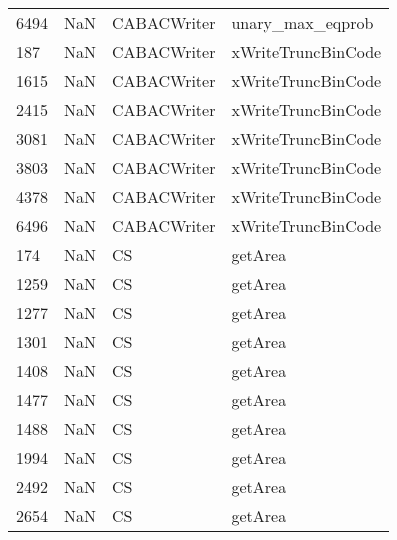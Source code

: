 \begin{tabular}{llll}
6494 &                   NaN &                CABACWriter &                          unary\_max\_eqprob \\
187  &                   NaN &                CABACWriter &                        xWriteTruncBinCode \\
1615 &                   NaN &                CABACWriter &                        xWriteTruncBinCode \\
2415 &                   NaN &                CABACWriter &                        xWriteTruncBinCode \\
3081 &                   NaN &                CABACWriter &                        xWriteTruncBinCode \\
3803 &                   NaN &                CABACWriter &                        xWriteTruncBinCode \\
4378 &                   NaN &                CABACWriter &                        xWriteTruncBinCode \\
6496 &                   NaN &                CABACWriter &                        xWriteTruncBinCode \\
174  &                   NaN &                         CS &                                   getArea \\
1259 &                   NaN &                         CS &                                   getArea \\
1277 &                   NaN &                         CS &                                   getArea \\
1301 &                   NaN &                         CS &                                   getArea \\
1408 &                   NaN &                         CS &                                   getArea \\
1477 &                   NaN &                         CS &                                   getArea \\
1488 &                   NaN &                         CS &                                   getArea \\
1994 &                   NaN &                         CS &                                   getArea \\
2492 &                   NaN &                         CS &                                   getArea \\
2654 &                   NaN &                         CS &                                   getArea \\

\end{tabular}
